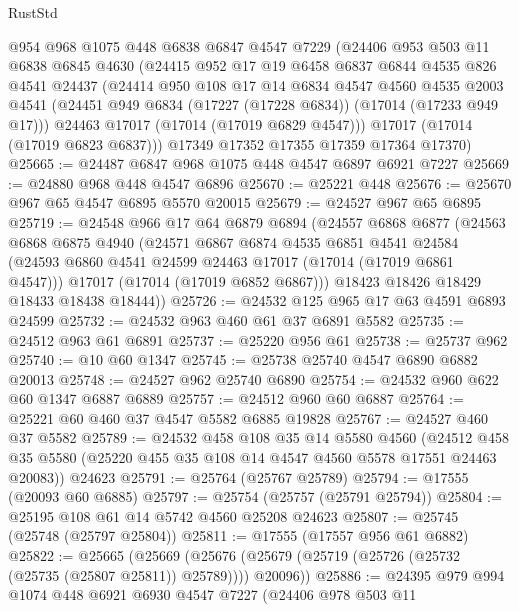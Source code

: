 \begin{lexlean}{RustStd}
\begin{coremodule}
{\begin{coremodule}
{{{{{{{{{{{{{{{{{{{{{{{{{{{{{{{{{{{{{{{{{{{{{{{{{{{{{{{    @954
    @968
    @1075
    @448
    @6838
    @6847
    @4547
    @7229
    (@24406
      @953
      @503
      @11
      @6838
      @6845
      @4630
      (@24415
        @952
        @17
        @19
        @6458
        @6837
        @6844
        @4535
        @826
        @4541
        @24437
        (@24414
          @950
          @108
          @17
          @14
          @6834
          @4547
          @4560
          @4535
          @2003
          @4541
          (@24451 @949 @6834 (@17227 (@17228 @6834)) (@17014 (@17233 @949 @17)))
          @24463
          @17017
          (@17014 (@17019 @6829 @4547)))
        @17017
        (@17014 (@17019 @6823 @6837)))
      @17349
      @17352
      @17355
      @17359
      @17364
      @17370)
@25665 := @24487 @6847 @968 @1075 @448 @4547 @6897 @6921 @7227
@25669 := @24880 @968 @448 @4547 @6896
@25670 := @25221 @448
@25676 := @25670 @967 @65 @4547 @6895 @5570 @20015
@25679 := @24527 @967 @65 @6895
@25719 := @24548
    @966
    @17
    @64
    @6879
    @6894
    (@24557
      @6868
      @6877
      (@24563
        @6868
        @6875
        @4940
        (@24571
          @6867
          @6874
          @4535
          @6851
          @4541
          @24584
          (@24593 @6860 @4541 @24599 @24463 @17017 (@17014 (@17019 @6861 @4547)))
          @17017
          (@17014 (@17019 @6852 @6867)))
        @18423
        @18426
        @18429
        @18433
        @18438
        @18444))
@25726 := @24532 @125 @965 @17 @63 @4591 @6893 @24599
@25732 := @24532 @963 @460 @61 @37 @6891 @5582
@25735 := @24512 @963 @61 @6891
@25737 := @25220 @956 @61
@25738 := @25737 @962
@25740 := @10 @60 @1347
@25745 := @25738 @25740 @4547 @6890 @6882 @20013
@25748 := @24527 @962 @25740 @6890
@25754 := @24532 @960 @622 @60 @1347 @6887 @6889
@25757 := @24512 @960 @60 @6887
@25764 := @25221 @60 @460 @37 @4547 @5582 @6885 @19828
@25767 := @24527 @460 @37 @5582
@25789 := @24532
    @458
    @108
    @35
    @14
    @5580
    @4560
    (@24512 @458 @35 @5580 (@25220 @455 @35 @108 @14 @4547 @4560 @5578 @17551 @24463 @20083))
    @24623
@25791 := @25764 (@25767 @25789)
@25794 := @17555 (@20093 @60 @6885)
@25797 := @25754 (@25757 (@25791 @25794))
@25804 := @25195 @108 @61 @14 @5742 @4560 @25208 @24623
@25807 := @25745 (@25748 (@25797 @25804))
@25811 := @17555 (@17557 @956 @61 @6882)
@25822 := @25665
    (@25669 (@25676 (@25679 (@25719 (@25726 (@25732 (@25735 (@25807 @25811)) @25789)))) @20096))
@25886 := @24395
    @979
    @994
    @1074
    @448
    @6921
    @6930
    @4547
    @7227
    (@24406
      @978
      @503
      @11
}}}}}}}}}}}}}}}}}}}}}}}}}}}}}}}}}}}}}}}}}}}}}}}}}}}}}}}
\end{coremodule}}
\end{coremodule}
\end{lexlean}
